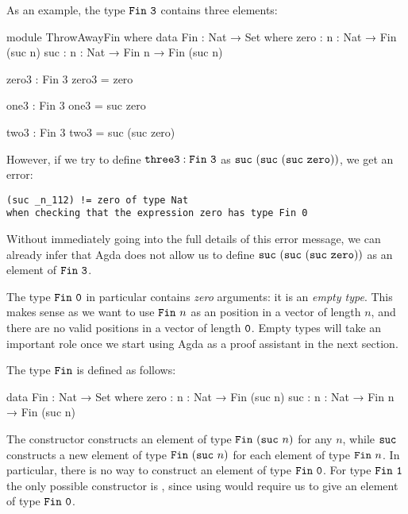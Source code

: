 \documentclass[a4paper,UKenglish]{tufte-handout}
\theoremstyle{definition}
\newcommand\fun[1]{{\AgdaFunction{#1}}}
\newcommand\data[1]{{\AgdaFunction{#1}}}
\newcommand\con[1]{{\AgdaInductiveConstructor{#1}}}
\newcommand\lit[1]{{\AgdaNumber{#1}}}
\newcommand\zero{\con{zero}}
\newcommand\suc{\con{suc}}
\newcommand\Fin{\data{Fin}}
\begin{document}
As an example, the type $\Fin\ \lit{3}$ contains three elements:
\begin{code}[hide]
module ThrowAwayFin where
  data Fin : Nat → Set where
    zero  : {n : Nat} → Fin (suc n)
    suc   : {n : Nat} → Fin n → Fin (suc n)
\end{code}
\begin{code}[number]
  zero3 : Fin 3
  zero3 = zero

  one3 : Fin 3
  one3   = suc zero

  two3 : Fin 3
  two3   = suc (suc zero)
\end{code}
However, if we try to define $\fun{three3} : \Fin\ \lit{3}$ as
$\suc\ (\suc\ (\suc\ \zero))$, we get an error:
\begin{verbatim}
(suc _n_112) != zero of type Nat
when checking that the expression zero has type Fin 0
\end{verbatim}
Without immediately going into the full details of this error message,
we can already infer that Agda does not allow us to
define $\suc\ (\suc\ (\suc\ \zero))$ as an element of $\Fin\ \lit{3}$.

The type $\Fin\ \lit{0}$ in particular
contains \emph{zero} arguments: it is an \emph{empty type}.
This makes sense as we want to use $\Fin\ n$ as an position
in a vector of length $n$, and there are no valid positions
in a vector of length $\lit{0}$. Empty types will take an important role once
we start using Agda as a proof assistant in the next section.

The type $\Fin$ is defined as follows:
\begin{code}[number]
data Fin : Nat → Set where
  zero  : {n : Nat} → Fin (suc n)
  suc   : {n : Nat} → Fin n → Fin (suc n)
\end{code}
The constructor \con{zero} constructs
an element of type $\data{Fin}~(\suc\ n)$ for any $n$,
while $\suc$ constructs a new element of type $\data{Fin}\
(\suc\ n)$ for each element of type $\data{Fin}\ n$.
In particular, there is no way
to construct an element of type $\data{Fin}\ \lit{0}$.
For type $\Fin\ \lit{1}$ the only possible constructor is \zero, since
using \suc{} would require us to give an element of type $\Fin\ \lit{0}$.
\end{document}
